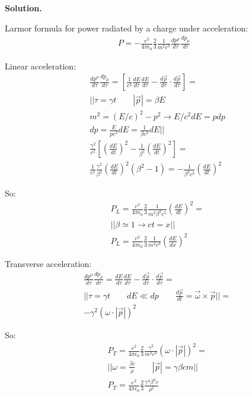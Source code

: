 \documentclass[11pt,a4paper]{article}
\newenvironment{solution}{\vspace{1cm} \par\textbf{Solution.} \vspace{1cm}}{\newpage}
\begin{document}
\begin{solution}

  Larmor formula for power radiated by a charge under acceleration:
\begin{align*}
  P = -\frac{e^{2}}{4\pi \epsilon_0} \frac{2}{3} \frac{1}{m^{2}c^3}  \frac{dp^{\mu}}{d\tau}\frac{dp_{\mu}}{d\tau} 
\end{align*}

Linear acceleration:
\begin{align*}
  & \frac{dp^{\mu}}{d\tau}\frac{dp_{\mu}}{d\tau} = \left[\frac{1}{c^{2}} \frac{dE}{d\tau}\frac{dE}{d\tau} - \frac{d\vec{p}}{d\tau}\cdot\frac{d\vec{p}}{d\tau}\right] = \\
  & || \tau = \gamma t \qquad |\vec{p}| = \beta E \\
  &    m^{2} = (E/c)^{2} - p^{2} \to E/c^{2}dE = pdp\\
  & dp = \frac{E}{p c^{2}} dE =  \frac{1}{\beta c^{2}} dE || \\
  & \frac{\gamma^{2}}{c^{2}} \left[\left( \frac{dE}{dt} \right)^{2} - \frac{1}{\beta^{2}} \left(\frac{dE}{dt} \right)^{2} \right] = \\
  & \frac{1}{c^{2}} \frac{\gamma^{2}}{\beta^{2}} \left( \frac{dE}{dt} \right)^{2} (\beta^{2} - 1) = -\frac{1}{\beta^{2}c^{2}} \left( \frac{dE}{dt} \right)^{2}
\end{align*}

So:
\begin{align*}
  & P_{L} = \frac{e^{2}}{4\pi \epsilon_0} \frac{2}{3} \frac{1}{m^{2}\beta^{2}c^5}  \left( \frac{dE}{dt} \right)^{2} = \\
  & || \beta \simeq 1 \to  ct = x|| \\
  & P_{L} = \frac{e^{2}}{4\pi \epsilon_0} \frac{2}{3} \frac{1}{m^{2}c^3}  \left( \frac{dE}{dx} \right)^{2}  
\end{align*}


Transverse acceleration:
\begin{align*}
  & \frac{dp^{\mu}}{d\tau}\frac{dp_{\mu}}{d\tau} = \frac{dE}{d\tau}\frac{dE}{d\tau} - \frac{d\vec{p}}{d\tau}\cdot\frac{d\vec{p}}{d\tau} = \\
  & || \tau = \gamma t \qquad dE \ll dp \qquad \frac{d\vec{p}}{dt} = \vec{\omega} \times \vec{p} || = \\
 & - \gamma^{2} (\omega \cdot |\vec{p}|)^{2} 
\end{align*}

So: 
\begin{align*}
  & P_{T} = \frac{e^{2}}{4\pi \epsilon_0} \frac{2}{3} \frac{\gamma^{2}}{m^{2}c^3}  (\omega \cdot |\vec{p}|)^{2} = \\
  & || \omega = \frac{\beta c}{\rho} \qquad |\vec{p}| = \gamma \beta c m|| \\
  & P_{T} = \frac{e^{2}}{4\pi \epsilon_0} \frac{2}{3} \frac{\gamma^{4} \beta^{4}c}{\rho^{2}}
\end{align*}


\end{solution}
\end{document}
